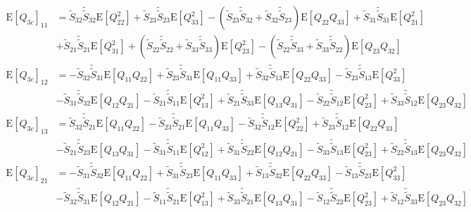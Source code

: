 \documentclass[10pt]{article}
\newcommand{\expect}[1]{\ensuremath{\mathrm{E}\left[ #1 \right]}}
\begin{document}
\begin{align}
	\expect{Q_{3c}}_{11} &= \tilde{S}_{32}\tilde{\tilde{S}}_{32}\expect{Q_{22}^2} + \tilde{S}_{23}\tilde{\tilde{S}}_{23}\expect{Q_{33}^2} - \left( \tilde{S}_{23}\tilde{\tilde{S}}_{32}+\tilde{S}_{32}\tilde{\tilde{S}}_{23} \right)\expect{Q_{22}Q_{33}} + \tilde{S}_{31}\tilde{\tilde{S}}_{31}\expect{Q_{21}^2} \nonumber \\
	&+ \tilde{S}_{21}\tilde{\tilde{S}}_{21}\expect{Q_{31}^2} + \left( \tilde{S}_{22}\tilde{\tilde{S}}_{22}+\tilde{S}_{33}\tilde{\tilde{S}}_{33} \right)\expect{Q_{23}^2} - \left( \tilde{S}_{22}\tilde{\tilde{S}}_{33}+\tilde{S}_{33}\tilde{\tilde{S}}_{22} \right)\expect{Q_{23}Q_{32}} \nonumber \\
	\expect{Q_{3c}}_{12} &= -\tilde{S}_{32}\tilde{\tilde{S}}_{31}\expect{Q_{11}Q_{22}} + \tilde{S}_{23}\tilde{\tilde{S}}_{31}\expect{Q_{11}Q_{33}} + 
	\tilde{S}_{32}\tilde{\tilde{S}}_{13}\expect{Q_{22}Q_{33}} - \tilde{S}_{23}\tilde{\tilde{S}}_{13}\expect{Q_{33}^2} \nonumber \\
	&- \tilde{S}_{31}\tilde{\tilde{S}}_{32}\expect{Q_{12}Q_{21}} - \tilde{S}_{21}\tilde{\tilde{S}}_{11}\expect{Q_{13}^2} + \tilde{S}_{21}\tilde{\tilde{S}}_{33}\expect{Q_{13}Q_{31}} - \tilde{S}_{22}\tilde{\tilde{S}}_{12}\expect{Q_{23}^2} + \tilde{S}_{33}\tilde{\tilde{S}}_{12}\expect{Q_{23}Q_{32}} \nonumber \\
	\expect{Q_{3c}}_{13} &= \tilde{S}_{32}\tilde{\tilde{S}}_{21}\expect{Q_{11}Q_{22}} - \tilde{S}_{23}\tilde{\tilde{S}}_{21}\expect{Q_{11}Q_{33}} - \tilde{S}_{32}\tilde{\tilde{S}}_{12}\expect{Q_{22}^2} + \tilde{S}_{23}\tilde{\tilde{S}}_{12}\expect{Q_{22}Q_{33}} \nonumber \\
	&- \tilde{S}_{21}\tilde{\tilde{S}}_{23}\expect{Q_{13}Q_{31}} - \tilde{S}_{31}\tilde{\tilde{S}}_{11}\expect{Q_{12}^2} + \tilde{S}_{31}\tilde{\tilde{S}}_{22}\expect{Q_{12}Q_{21}} - \tilde{S}_{33}\tilde{\tilde{S}}_{13}\expect{Q_{23}^2} + \tilde{S}_{22}\tilde{\tilde{S}}_{13}\expect{Q_{23}Q_{32}} \nonumber \\
	\expect{Q_{3c}}_{21} &= -\tilde{S}_{31}\tilde{\tilde{S}}_{32}\expect{Q_{11}Q_{22}} + \tilde{S}_{31}\tilde{\tilde{S}}_{23}\expect{Q_{11}Q_{33}} + \tilde{S}_{13}\tilde{\tilde{S}}_{32}\expect{Q_{22}Q_{33}} - \tilde{S}_{13}\tilde{\tilde{S}}_{23}\expect{Q_{33}^2} \nonumber \\
	&- \tilde{S}_{32}\tilde{\tilde{S}}_{31}\expect{Q_{12}Q_{21}} - \tilde{S}_{11}\tilde{\tilde{S}}_{21}\expect{Q_{13}^2} + \tilde{S}_{33}\tilde{\tilde{S}}_{21}\expect{Q_{13}Q_{31}} - \tilde{S}_{12}\tilde{\tilde{S}}_{22}\expect{Q_{23}^2} + \tilde{S}_{12}\tilde{\tilde{S}}_{33}\expect{Q_{23}Q_{32}} \nonumber \\

\end{align}
\end{document}
